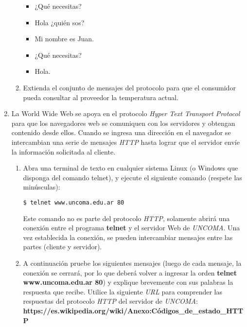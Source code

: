 \documentclass[12pt]{article}
\begin{document}
\begin{enumerate}
\begin{enumerate}
\begin{itemize}
            \item ¿Qué necesitas?

            \item Hola ¿quién sos?

            \item Mi nombre es Juan.

            \item ¿Qué necesitas?

            \item Hola.

        \end{itemize}

        \item Extienda el conjunto de mensajes del protocolo para que el
consumidor pueda consultar al proveedor la temperatura actual.

    \end{enumerate}

    \item La World Wide Web se apoya en el protocolo \emph{Hyper Text
        Transport Protocol} para que los navegadores web se comuniquen con los
        servidores y obtengan contenido desde ellos. Cuando se ingresa una
        dirección en el navegador se intercambian una serie de mensajes
        \emph{HTTP} hasta lograr que el servidor envíe la información
        solicitada al cliente. 

    \begin{enumerate}

    \item Abra una terminal de texto en cualquier sistema Linux (o Windows que
        disponga del comando telnet), y ejecute el siguiente comando (respete
            las minúsculas): 

            \begin{verbatim}
$ telnet www.uncoma.edu.ar 80
            \end{verbatim}

            Este comando no es parte del protocolo \emph{HTTP}, solamente
            abrirá una conexión entre el programa \textbf{telnet} y el
            servidor Web de \emph{UNCOMA}. Una vez establecida la conexión, se
            pueden intercambiar mensajes entre las partes (cliente y
            servidor).

    \item A continuación pruebe los siguientes mensajes (luego de cada
        mensaje, la conexión se cerrará, por lo que deberá volver a ingresar
            la orden \textbf{telnet www.uncoma.edu.ar 80}) y explique
            brevemente con sus palabras la respuesta que recibe. Utilice la
            siguiente \emph{URL} para comprender las respuestas del protocolo
            \emph{HTTP} del servidor de \emph{UNCOMA}:
            \textbf{https://es.wikipedia.org/wiki/Anexo:C\'odigos\_de\_estado\_HTTP}


\end{enumerate}
\end{enumerate}
\end{document}
